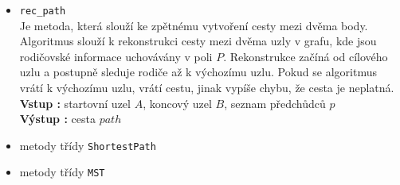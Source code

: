 \begin{itemize}
    \item \texttt{rec\_path}\\
    Je metoda, která slouží ke zpětnému vytvoření cesty mezi dvěma body. Algoritmus slouží k rekonstrukci cesty mezi dvěma uzly v grafu, kde jsou rodičovské informace uchovávány v poli $P$. Rekonstrukce začíná od cílového uzlu a postupně sleduje rodiče až k výchozímu uzlu. Pokud se algoritmus vrátí k výchozímu uzlu, vrátí cestu, jinak vypíše chybu, že cesta je neplatná.\\
    \textbf{Vstup : } startovní uzel $A$, koncový uzel $B$, seznam předchůdců $p$\\
    \textbf{Výstup : } cesta $path$
    
    \item metody třídy \texttt{ShortestPath}
    \item metody třídy \texttt{MST}
\end{itemize}